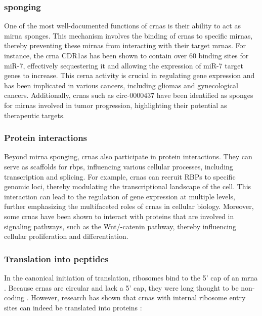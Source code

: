 \subsubsection{ sponging}
One of the most well-documented functions of \glspl{crna} is their ability to
act as \gls{mirna} sponges.
This mechanism involves the binding of \glspl{crna} to specific \glspl{mirna},
thereby preventing these \glspl{mirna} from interacting with their target
\glspl{mrna}.
For instance, the \gls{crna} CDR1as has been shown to contain over 60 binding
sites for miR-7, effectively sequestering it and allowing the expression of
miR-7 target genes to
increase\supercite{guo_expanded_2014,yuan_regulatory_2020}.
This \gls{cerna} activity is crucial in regulating gene expression and has been
implicated in various cancers, including gliomas and gynecological
cancers\supercite{dong_expression_2020,song_circular_2016}.
Additionally, \glspl{crna} such as circ-0000437 have been identified as sponges
for \glspl{mirna} involved in tumor progression, highlighting their potential
as therapeutic targets\supercite{li_peptide_2021,cui_circular_2022}.

\subsubsection{Protein interactions}
Beyond \gls{mirna} sponging, \glspl{crna} also participate in protein
interactions.
They can serve as scaffolds for \glspl{rbp}, influencing various cellular
processes, including transcription and
splicing\supercite{li_comprehensive_2017,qu_emerging_2017}.
For example, \glspl{crna} can recruit RBPs to specific genomic loci, thereby
modulating the transcriptional landscape of the
cell\supercite{li_comprehensive_2017}.
This interaction can lead to the regulation of gene expression at multiple
levels, further emphasizing the multifaceted roles of \glspl{crna} in cellular
biology\supercite{zhang_important_2024,he_targeting_2021}.
Moreover, some \glspl{crna} have been shown to interact with proteins that are
involved in signaling pathways, such as the Wnt/\textbeta{}-catenin pathway,
thereby influencing cellular proliferation and
differentiation\supercite{peng_novel_2021}.

\subsubsection{Translation into peptides}
In the canonical initiation of translation, ribosomes bind to the 5' cap of an
\gls{mrna} \supercite{hinnebusch_mechanism_2012}.
Because \glspl{crna} are circular and lack a 5' cap, they were long thought to
be non-coding \supercite{bao_regulatory_2019,greene_circular_2017}.
However, research has shown that \glspl{crna} with internal ribosome entry
sites can indeed be translated into proteins \supercite{chen_expanding_2020}:

